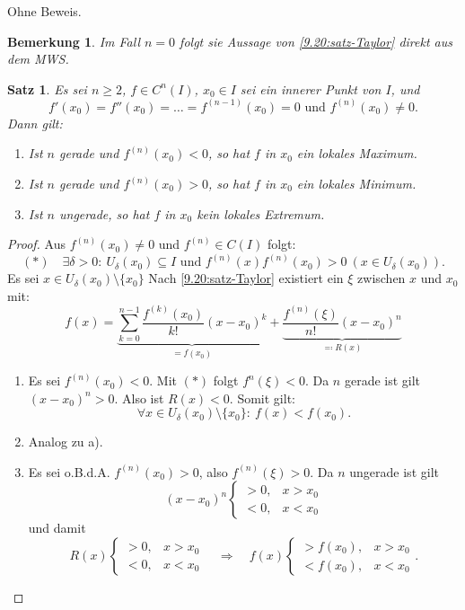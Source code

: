 \documentclass[12pt]{extreport} %
\theoremstyle{named}
\theoremstyle{itshape}
\newtheorem{satz}[unnamedtheorem]{Satz}
\theoremstyle{normal}
\newtheorem*{bemerkung}{Bemerkung}
\begin{document}
{Ohne Beweis.

\begin{bemerkung}
	Im Fall $n = 0$ folgt sie Aussage von \ref{9.20:satz-Taylor} direkt aus dem MWS.	
\end{bemerkung}


\begin{satz} \label{9.21:satz}
	Es sei $n \geq 2$, $f \in C^{n}(I)$, $x_{0} \in I$ sei ein innerer Punkt von $I$, und
	$$ f'(x_{0}) = f''(x_{0}) = \dotsc = f^{(n-1)}(x_{0}) = 0 \text{ und } f^{(n)}(x_{0}) \neq 0. $$
	Dann gilt:
	\begin{enumerate}
		\item Ist $n$ gerade und $f^{(n)}(x_{0}) < 0$, so hat $f$ in $x_{0}$ ein lokales Maximum.
		\item Ist $n$ gerade und $f^{(n)}(x_{0}) > 0$, so hat $f$ in $x_{0}$ ein lokales Minimum.
		\item Ist $n$ ungerade, so hat $f$ in $x_{0}$ kein lokales Extremum. 
	\end{enumerate}	
\end{satz}

\begin{proof}
	Aus $f^{(n)}(x_{0}) \neq 0$ und $f^{(n)} \in C(I)$ folgt: 
	$$ (\ast) \quad \exists \delta > 0: ~ U_{\delta}(x_{0}) \subseteq I \text{ und }  f^{(n)}(x) f^{(n)}(x_0) > 0 ~ (x \in U_{\delta}(x_{0})).$$
	Es sei $x \in U_{\delta}(x_{0}) \setminus \{ x_{0} \}$ Nach \ref{9.20:satz-Taylor} existiert ein $\xi$ zwischen $x$ und $x_{0}$ mit:
	$$ f(x) = \underbrace{\sum_{k=0}^{n-1} \frac{f^{(k)}(x_{0})}{k!} (x - x_{0})^{k}}_{= f(x_{0})} + \underbrace{\frac{f^{(n)}(\xi)}{n!} (x - x_{0})^{n}}_{\eqqcolon R(x)} $$
	\begin{enumerate}
		\item Es sei $f^{(n)}(x_{0}) < 0$. Mit $(\ast)$ folgt $f^{n}(\xi) < 0$. Da $n$ gerade ist gilt $(x - x_{0})^{n} > 0$. Also ist $R(x) < 0$. Somit gilt: 
		      $$\forall x \in U_{\delta}(x_{0}) \setminus \{ x_{0} \}: ~ f(x) < f(x_{0}).$$
		\item Analog zu a).
		\item Es sei o.B.d.A. $f^{(n)}(x_{0}) > 0$, also $f^{(n)}(\xi) > 0$. Da $n$ ungerade ist gilt
			$$ (x - x_{0})^{n} \begin{cases} > 0, & x > x_{0} \\ < 0, & x < x_{0} \end{cases} $$
			und damit
			$$ R(x) \begin{cases} > 0, & x > x_{0} \\ < 0, & x < x_{0} \end{cases} 
			\quad \Rightarrow  \quad f(x) \begin{cases} > f(x_{0}), & x > x_{0} \\ < f(x_{0}), & x < x_{0} \end{cases}.$$
			

\end{enumerate}
\end{proof}}
\end{document}

